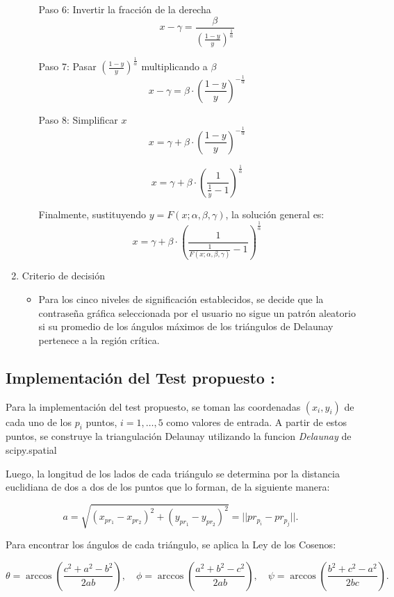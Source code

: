 \documentclass[12pt]{report}
\begin{document}
\begin{enumerate}
\begin{itemize}
		Paso 6: Invertir la fracción de la derecha
		\[
		x - \gamma = \frac{\beta}{\left( \frac{1 - y}{y} \right)^{\frac{1}{\alpha}}}
		\]
		
		Paso 7: Pasar \( \left( \frac{1 - y}{y} \right)^{\frac{1}{\alpha}} \) multiplicando a \( \beta \)
		\[
		x - \gamma = \beta \cdot \left( \frac{1 - y}{y} \right)^{-\frac{1}{\alpha}}
		\]
		
		Paso 8: Simplificar \( x \)
		\[
		x = \gamma + \beta \cdot \left( \frac{1 - y}{y} \right)^{-\frac{1}{\alpha}}
		\]
		
		\[
		x = \gamma + \beta \cdot \left( \frac{1}{\frac{1}{y}-1} \right)^{\frac{1}{\alpha}}
		\]
		
		Finalmente, sustituyendo \( y = F(x; \alpha, \beta, \gamma) \), la solución general es:
		\[
		x = \gamma + \beta \cdot \left( \frac{1}{\frac{1}{F(x; \alpha, \beta, \gamma)}-1} \right)^{\frac{1}{\alpha}}
		\]
		
	\end{itemize}
	\item Criterio de decisión
	\begin{itemize}
		\item Para los cinco niveles de significación establecidos, se decide que la contraseña gráfica seleccionada por el usuario no sigue un patrón aleatorio si su promedio de los ángulos máximos de los triángulos de Delaunay  pertenece a la región crítica. 
	\end{itemize}
\end{enumerate}
\subsection{Implementación del Test propuesto :}

Para la implementación del test propuesto, se toman las coordenadas \((x_i, y_i)\) de cada uno de los \(p_i\) puntos, \(i = 1, \ldots, 5\) como valores de entrada. A partir de estos puntos, se construye la triangulación Delaunay utilizando la funcion \textit{Delaunay} de scipy.spatial

Luego, la longitud de los lados de cada triángulo se determina por la distancia euclidiana de dos a dos de los puntos que lo forman, de la siguiente manera:

\[
a = \sqrt{(x_{pr_1} - x_{pr_2})^2 + (y_{pr_1} - y_{pr_2})^2} = ||pr_{p_i} - pr_{p_j}||.
\]

Para encontrar los ángulos de cada triángulo, se aplica la Ley de los Cosenos:

\[
\theta = \arccos\left(\frac{c^2 + a^2 - b^2}{2ab}\right), \quad \phi = \arccos\left(\frac{a^2 + b^2 - c^2}{2ab}\right), \quad \psi = \arccos\left(\frac{b^2 + c^2 - a^2}{2bc}\right).
\]
\end{document}

